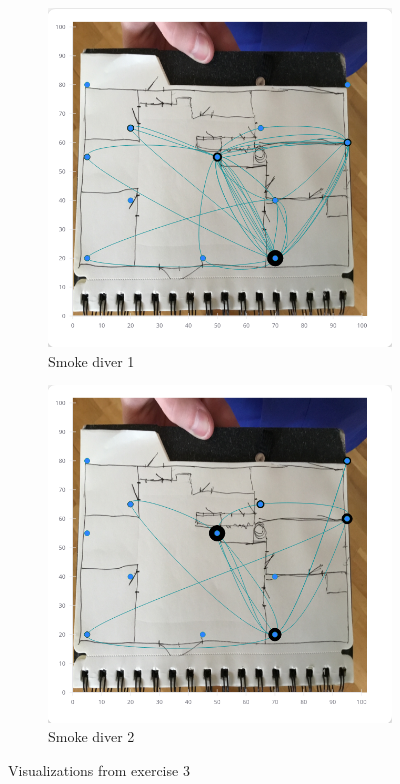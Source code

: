 \documentclass[../Main/thesis.tex]{subfiles}
\begin{document}
\begin{figure}[H]
	\centering
	\begin{subfigure}{0.7\textwidth}
		\includegraphics[width=\textwidth]{../fig/eval_3_fredrik}
		\caption{Smoke diver 1}
		\label{fig:eval-visualization-3-2-app}
	\end{subfigure}
	\begin{subfigure}{0.7\textwidth}
		\includegraphics[width=\textwidth]{../fig/eval_3_remi}
		\caption{Smoke diver 2}
		\label{fig:eval-visualization-3-1-app}
	\end{subfigure}
	\caption{Visualizations from exercise 3}
	\label{fig:eval-visualization-3-app}
\end{figure}
\end{document}
